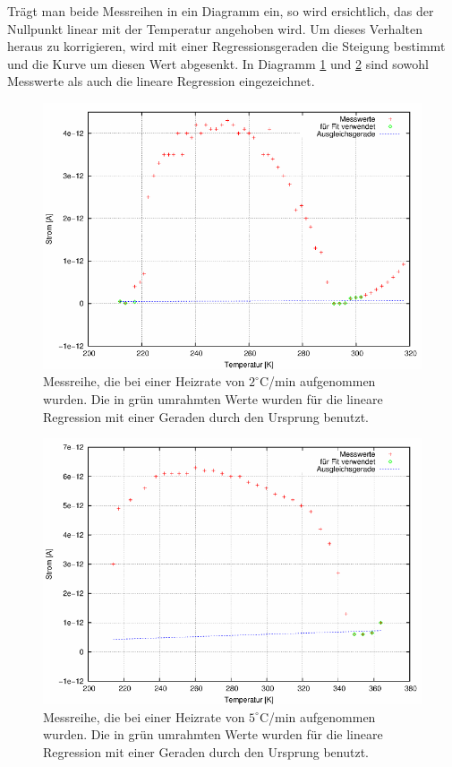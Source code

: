 Trägt man beide Messreihen in ein Diagramm ein, so wird ersichtlich, das der Nullpunkt linear mit der Temperatur angehoben wird. Um dieses Verhalten heraus zu korrigieren, wird mit einer Regressionsgeraden die Steigung bestimmt und die Kurve um diesen Wert abgesenkt. In Diagramm \ref{pic_dia1} und \ref{pic_dia2} sind sowohl Messwerte als auch die lineare Regression eingezeichnet.

\begin{figure}[htbp]
\includegraphics[scale=0.8]{../gnu/relax11.pdf}
\caption{Messreihe, die bei einer Heizrate von $2^\circ$C/min aufgenommen wurden. Die in grün umrahmten Werte wurden für die lineare Regression mit einer Geraden durch den Ursprung benutzt.}
\label{pic_dia1}
\end{figure}
\begin{figure}[htbp]
\includegraphics[scale=0.8]{../gnu/relax12.pdf}
\caption{Messreihe, die bei einer Heizrate von $5^\circ$C/min aufgenommen wurden. Die in grün umrahmten Werte wurden für die lineare Regression mit einer Geraden durch den Ursprung benutzt.}
\label{pic_dia2}
\end{figure}

